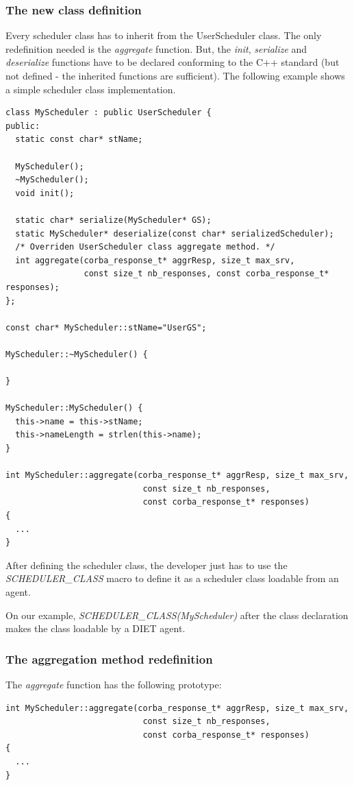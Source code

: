\subsubsection{The new class definition}
Every scheduler class has to inherit from the UserScheduler class. The only
redefinition needed is the \textit{aggregate} function. But, the \textit{init},
\textit{serialize} and \textit{deserialize} functions have to be declared
conforming to the C++ standard (but not defined - the inherited functions are
sufficient). The following example shows a simple scheduler class
implementation.
\begin{verbatim}
class MyScheduler : public UserScheduler {
public:
  static const char* stName;

  MyScheduler();
  ~MyScheduler();
  void init();

  static char* serialize(MyScheduler* GS);
  static MyScheduler* deserialize(const char* serializedScheduler);
  /* Overriden UserScheduler class aggregate method. */
  int aggregate(corba_response_t* aggrResp, size_t max_srv,
                const size_t nb_responses, const corba_response_t* responses);
};

const char* MyScheduler::stName="UserGS";

MyScheduler::~MyScheduler() {

}

MyScheduler::MyScheduler() {
  this->name = this->stName;
  this->nameLength = strlen(this->name);
}

int MyScheduler::aggregate(corba_response_t* aggrResp, size_t max_srv,
                            const size_t nb_responses,
                            const corba_response_t* responses)
{
  ...
}
\end{verbatim}
After defining the scheduler class, the developer just has to use the
\textit{SCHEDULER\_CLASS} macro to define it as a scheduler class loadable
from an agent.

On our example, \textit{SCHEDULER\_CLASS(MyScheduler)} after the class
declaration makes the class loadable by a DIET agent.
\subsubsection{The aggregation method redefinition}
The \textit{aggregate} function has the following prototype:
\begin{verbatim}
int MyScheduler::aggregate(corba_response_t* aggrResp, size_t max_srv,
                            const size_t nb_responses,
                            const corba_response_t* responses)
{
  ...
}
\end{verbatim}

